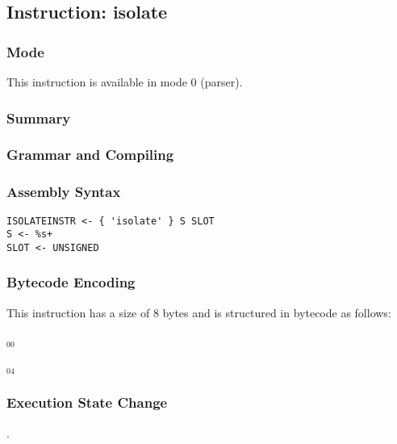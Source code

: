 \subsection{Instruction: isolate}

\subsubsection{Mode}
This instruction is available in mode 0 (parser).
\subsubsection{Summary}


\subsubsection{Grammar and Compiling}


\subsubsection{Assembly Syntax}

\begin{myquote}
\begin{verbatim}
ISOLATEINSTR <- { 'isolate' } S SLOT
S <- %s+
SLOT <- UNSIGNED
\end{verbatim}
\end{myquote}

\subsubsection{Bytecode Encoding}

This instruction has a size of 8 bytes and is structured in bytecode as follows:

$_{00}$\ 



$_{04}$\ 


\subsubsection{Execution State Change}

.


